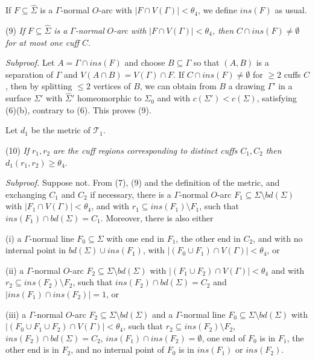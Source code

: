 If $F \subseteq \hat{\Sigma}$ is a $\Gamma$-normal $O$-arc with $|F \cap V(\Gamma)| < \theta_4$, we define $ins(F)$ as usual.

\hspace*{12pt}(9) \textit{If} $F \subseteq \hat{\Sigma}$ \textit{is a} $\Gamma$\textit{-normal} $O$\textit{-arc with} $|F \cap V(\Gamma)| < \theta_4$\textit{, then} $C \cap ins(F) \ne \emptyset$ \textit{for at most one cuff} $C$.

\textit{Subproof.} Let $A = \Gamma \cap ins(F)$ and choose $B \subseteq \Gamma$ so that $(A, B)$ is a separation of $\Gamma$ and $V(A \cap B) = V(\Gamma) \cap F$. If $C \cap ins(F) \ne \emptyset$ for $\ge 2$ cuffs $C$, then by splitting $\le 2$ vertices of $B$, we can obtain from $B$ a drawing $\Gamma'$ in a surface $\Sigma'$ with $\hat{\Sigma}'$ homeomorphic to $\Sigma_0$ and with $c(\Sigma') < c(\Sigma)$, satisfying (6)(b), contrary to (6). This proves (9).

Let $d_1$ be the metric of $\mathcal{T}_1$.

\hspace*{12pt}(10) \textit{If} $r_1, r_2$ \textit{are the cuff regions corresponding to distinct cuffs} $C_1, C_2$ \textit{then} $d_1(r_1, r_2) \ge \theta_4$.

\textit{Subproof.} Suppose not. From (7), (9) and the definition of the metric, and exchanging $C_1$ and $C_2$ if necessary, there is a $\Gamma$-normal $O$-arc $F_1 \subseteq \Sigma \setminus bd(\Sigma)$ with $|F_1 \cap V(\Gamma)| < \theta_4$, and with $r_1 \subseteq ins(F_1) \setminus F_1$, such that $ins(F_1) \cap bd(\Sigma) = C_1$. Moreover, there is also either

\hspace*{12pt}(i) a $\Gamma$-normal line $F_0 \subseteq \Sigma$ with one end in $F_1$, the other end in $C_2$, and with no internal point in $bd(\Sigma) \cup ins(F_1)$, with $|(F_0 \cup F_1) \cap V(\Gamma)| < \theta_4$, or

\hspace*{12pt}(ii) a $\Gamma$-normal $O$-arc $F_2 \subseteq \Sigma \setminus bd(\Sigma)$ with $|(F_1 \cup F_2) \cap V(\Gamma)| < \theta_4$ and with $r_2 \subseteq ins(F_2) \setminus F_2$, such that $ins(F_2) \cap bd(\Sigma) = C_2$ and $|ins(F_1) \cap ins(F_2)| = 1$, or

\hspace*{12pt}(iii) a $\Gamma$-normal $O$-arc $F_2 \subseteq \Sigma \setminus bd(\Sigma)$ and a $\Gamma$-normal line $F_0 \subseteq \Sigma \setminus bd(\Sigma)$ with $|(F_0 \cup F_1 \cup F_2) \cap V(\Gamma)| < \theta_4$, such that $r_2 \subseteq ins(F_2) \setminus F_2$, $ins(F_2) \cap bd(\Sigma) = C_2$, $ins(F_1) \cap ins(F_2) = \emptyset$, one end of $F_0$ is in $F_1$, the other end is in $F_2$, and no internal point of $F_0$ is in $ins(F_1)$ or $ins(F_2)$.

